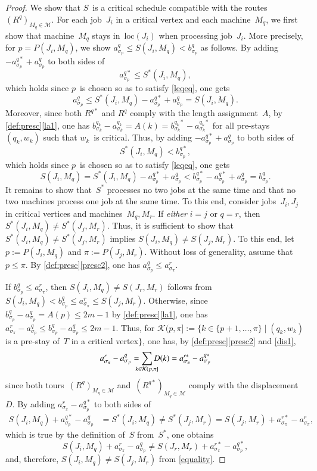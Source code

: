 \documentclass[natbib,sort,smallextended,envcountsame,envcountsect,numbook]{svjour3}
\newcommand{\loc}{\text{loc}}
\newcommand{\Ms}{\mathcal M}
\newcommand{\nmach}{m}
\begin{document}
\begin{proof}
We show that \(S\)~is a critical schedule compatible with the routes \((R^q)_{M_q\in\Ms}\).
For each job~\(J_i\) in a critical vertex and each machine~\(M_q\),
we first show that machine~\(M_q\) stays in~\(\loc(J_i)\) when processing job~\(J_i\).
More precisely, for  \(p=P(J_i,M_q)\),
we show \(a^{q}_{\sigma_p}\leq S(J_i,M_q)<b^{q}_{\sigma_p}\) as follows.
By adding \(-a^{q*}_{\sigma_p}+a^{q}_{\sigma_p}\) to both sides of
\[  a^{q*}_{\sigma_p}\leq S^*(J_i,M_q),\]
which holds since \(p\)~is chosen so as to satisfy \eqref{leqeq}, one gets
\[  a^{q}_{\sigma_p}\leq S^*(J_i,M_q)-a^{q*}_{\sigma_p}+a^{q}_{\sigma_p}=S(J_i,M_q).\]
 Moreover, since both \(R^{q*}\) and \(R^q\) comply with the length assignment~\(A\), by \cref{def:presc}\eqref{la1}, one has \(b_{\sigma_k}^{q_k}-a_{\sigma_k}^{q_k}=A(k)=b^{q_k*}_{\sigma_k}-a^{q_k*}_{\sigma_k}\) for all pre-stays \(({q_k},w_k)\) such that \(w_k\)~is critical. Thus, by adding \(-a^{q*}_{\sigma_p}+a^{q}_{\sigma_p}\) to both sides of
\[S^*(J_i,M_q)< b^{q*}_{\sigma_p},\]
which holds since \(p\)~is chosen so as to satisfy \eqref{leqeq}, one gets
\[  S(J_i,M_q)= S^*(J_i,M_q)-a^{q*}_{\sigma_p}+a^{q}_{\sigma_p}< b^{q*}_{\sigma_p}-a^{q*}_{\sigma_p}+a^{q}_{\sigma_p}=b^{q}_{\sigma_p}.\]
It remains to show that~\(S^*\) processes no two jobs at the same time and that no two machines process one job at the same time.  To this end, consider jobs~\(J_i,J_j\) in critical vertices and machines~\(M_q, M_r\).  If \emph{either} \(i=j\) or \(q=r\), then \(S^*(J_i,M_q)\ne S^*(J_j,M_r)\).  Thus, it is sufficient to show that \(S^*(J_i,M_q)\ne S^*(J_j,M_r)\) implies \(S(J_i,M_q)\ne S(J_j,M_r)\).  
To this end, let \(p:=P(J_i,M_q)\) and \(\pi:=P(J_j,M_r)\).
Without loss of generality, assume that~\(p\leq\pi\).  
By \cref{def:presc}\eqref{presc2}, one has \(a^{q}_{\sigma_p}\leq a^{r}_{\sigma_\pi}\). 

If \(b_{\sigma_p}^{q}\leq a^{r}_{\sigma_\pi}\), then \(S(J_i,M_q)\ne S(J_r,M_r)\) follows from
\(
S(J_i,M_q)< b^{q}_{\sigma_p}\leq a^{r}_{\sigma_\pi}\leq S(J_j,M_r).
\)
Otherwise, since \(b^{q}_{\sigma_p}-a^{q}_{\sigma_p}=A(p)\leq 2\nmach-1\) by \cref{def:presc}\eqref{la1}, one has \(a^r_{\sigma_\pi}-a^q_{\sigma_p}\leq b^q_{\sigma_p}-a^q_{\sigma_p}\leq 2\nmach-1\).  Thus, for \(\mathcal K(p,\pi]:=\{k\in\{p+1,\dots,\pi\}\mid ({q_k},w_k)\) is a pre-stay of~\(T\) in a critical vertex\(\}\),  one has, by \cref{def:presc}\eqref{presc2} and \eqref{dis1},
\begin{align}
a^r_{\sigma_\pi}-a^q_{\sigma_p}=\smashoperator{\sum_{k\in\mathcal K(p,\pi]}}D(k)=a^{r*}_{\sigma_\pi}-a_{\sigma_p}^{q*}\label{equality}
\end{align}
since both tours~\((R^q)_{M_q\in\Ms}\) and~\((R^{q*})_{M_q\in\Ms}\)
comply with the displacement~\(D\).  
By adding \(a^r_{\sigma_\pi}-a^{q*}_{\sigma_p}\) to both sides of
\begin{align*}
  S(J_i,M_q)+a^{q*}_{\sigma_p}-a^q_{\sigma_p}&=S^*(J_i,M_q)\ne S^*(J_j,M_r)=S(J_j,M_r)+a^{r*}_{\sigma_\pi}-a^r_{\sigma_\pi},
\end{align*}
which is true by the definition of~\(S\) from~\(S^*\), one obtains
\[
S(J_i,M_q)+a^r_{\sigma_\pi}-a^q_{\sigma_p}\ne S(J_r,M_r)+a^{r*}_{\sigma_\pi}-a^{q*}_{\sigma_p},
\]
and, therefore,  \(S(J_i,M_q)\ne S(J_j,M_r)\) from \eqref{equality}.



\end{proof}
\end{document}
